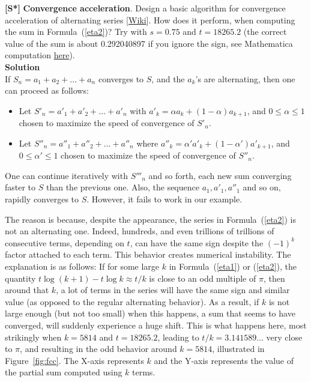 \documentclass[10pt]{article}
\begin{document}
\begin{Exercise}\label{exercise12}{\bf [S*]}
{\bf Convergence acceleration}.
Design a basic algorithm for \textcolor{index}{convergence acceleration} of
alternating series [\href{https://en.wikipedia.org/wiki/Alternating_series}{Wiki}].
How does it perform, when computing the sum in
Formula~(\ref{eta2})? Try with $s=0.75$ and $t=18265.2$ (the correct value of the sum is about 0.292040897 if you ignore the sign, see Mathematica computation \href{https://bit.ly/32uIwpE}{here}). \vspace{1ex}   \\
{\bf Solution} \vspace{1ex}   \\
If $S_n=a_1+a_2+\dots+a_n$ converges to $S$, and the $a_k$'s are alternating, then one can proceed as follows:

\begin{itemize}
\item Let $S'_n=a'_1+a'_2+\dots +a'_n$ with $a'_k= \alpha a_k + (1-\alpha)a_{k+1}$, and $0\leq \alpha\leq 1$ chosen to maximize the speed of convergence of $S'_n$.
\item Let $S''_n=a''_1+a''_2 +\dots  +a''_n$ where $a''_k= \alpha' a'_k + (1-\alpha')a'_{k+1}$, and $0\leq \alpha' \leq1$ chosen to maximize the speed of convergence of $S''_n$.
\end{itemize}
One can continue iteratively with $S'''_n$ and so forth, each new sum converging faster to $S$ than the previous one. Also, the sequence $a_1,a'_1,a''_1$ and so on, rapidly converges to $S$.  However, it fails to work in our example.

The reason is because, despite the appearance, the series in Formula~(\ref{eta2}) is not an alternating one. Indeed, hundreds, and even trillions of trillions of consecutive terms, depending on $t$, can have the same sign despite the $(-1)^k$ factor attached to each term. This behavior creates  \textcolor{index}{numerical instability}. The explanation is as follows: If for some large $k$ in Formula~(\ref{eta1}) or (\ref{eta2}),  the quantity $t \log(k+1)-t \log k \approx t/k$
is close to an odd multiple of $\pi$, then around that $k$, a lot of terms in the series will have the same sign and similar value (as opposed to the regular alternating behavior). As a result, if $k$ is not large enough (but not too small) when this happens, a sum that seems to have converged, will suddenly experience a huge shift. This is what happens here, most strikingly when $k=5814$ and $t=18265.2$, leading to $t/k =3.141589\dots$ very close to $\pi$, and resulting in the odd behavior around $k=5814$, illustrated in Figure~\ref{fig:fcc}. The X-axis represents $k$ and the Y-axis represents the value of the partial sum computed using $k$ terms.



\end{Exercise}
\end{document}
